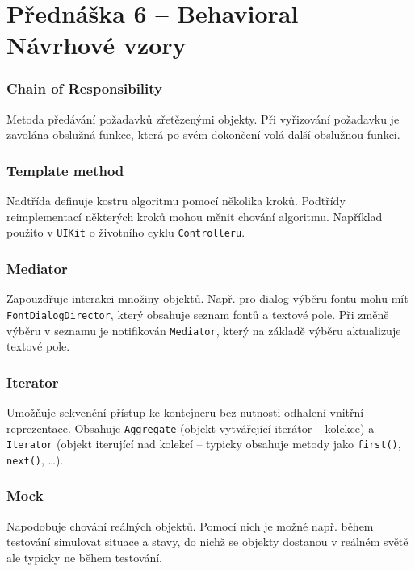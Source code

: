 \section{Přednáška 6 -- Behavioral Návrhové vzory}

\subsubsection{Chain of Responsibility}

Metoda předávání požadavků zřetězenými objekty.
Při vyřizování požadavku je zavolána obslužná funkce, která po svém dokončení volá další obslužnou funkci.

\subsubsection{Template method}

Nadtřída definuje kostru algoritmu pomocí několika kroků.
Podtřídy reimplementací některých kroků mohou měnit chování algoritmu.
Například použito v \texttt{UIKit} o životního cyklu \texttt{Controlleru}.

\subsubsection{Mediator}

Zapouzdřuje interakci množiny objektů.
Např. pro dialog výběru fontu mohu mít \texttt{FontDialogDirector}, který obsahuje seznam fontů a textové pole.
Při změně výběru v seznamu je notifikován \texttt{Mediator}, který na základě výběru aktualizuje textové pole.

\subsubsection{Iterator}

Umožňuje sekvenční přístup ke kontejneru bez nutnosti odhalení vnitřní reprezentace.
Obsahuje \texttt{Aggregate} (objekt vytvářející iterátor -- kolekce) a \texttt{Iterator} (objekt iterující nad kolekcí -- typicky obsahuje metody jako \texttt{first()}, \texttt{next()}, \dots).

\subsubsection{Mock}

Napodobuje chování reálných objektů.
Pomocí nich je možné např. během testování simulovat situace a stavy, do nichž se objekty dostanou v reálném světě ale typicky ne během testování.

